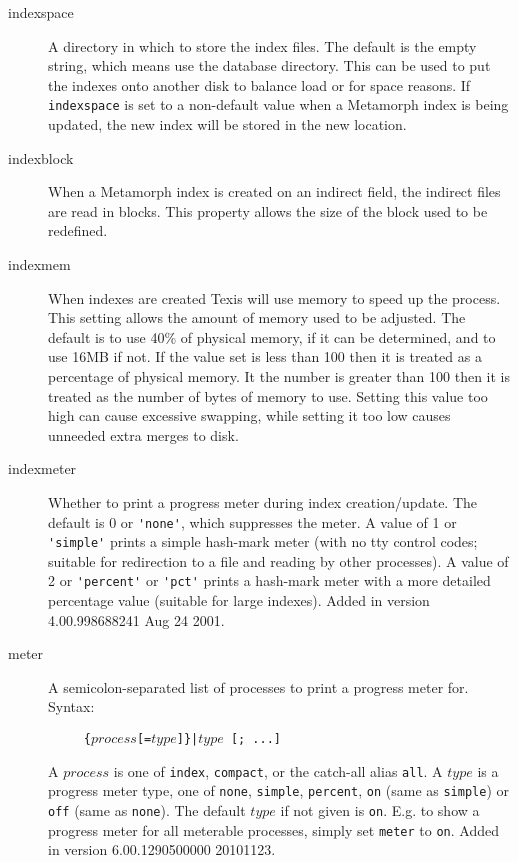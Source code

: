\begin{description}

\item[indexspace]
\label{indexspace}
A directory in which to store the index files.  The
default is the empty string, which means use the database directory.
This can be used to put the indexes onto another disk to balance load
or for space reasons.  If \verb`indexspace` is set to a non-default
value when a Metamorph index is being updated, the new index will be
stored in the new location.

\item[indexblock] When a Metamorph index is created on an indirect field,
the indirect files are read in blocks.  This property allows the size
of the block used to be redefined.

\item[indexmem]
\label{indexmem}
  When indexes are created Texis will use memory to speed up the
process.  This setting allows the amount of memory used to be
adjusted.  The default is to use 40\% of physical memory, if it
can be determined, and to use 16MB if not.  If the value set is less
than 100 then it is treated as a percentage of physical memory.  It
the number is greater than 100 then it is treated as the number of
bytes of memory to use.  Setting this value too high can cause
excessive swapping, while setting it too low causes unneeded extra
merges to disk.

\item[indexmeter]
\label{indexmeter}
  Whether to print a progress meter during index creation/update.
The default is 0 or \verb`'none'`, which suppresses the meter.
A value of 1 or \verb`'simple'` prints a simple hash-mark meter
(with no tty control codes; suitable for redirection to a file and
reading by other processes).  A value of 2 or \verb`'percent'` or
\verb`'pct'` prints a hash-mark meter with a more detailed percentage
value (suitable for large indexes).  Added in
version 4.00.998688241 Aug 24 2001.

\item[meter]

  A semicolon-separated list of processes to print a progress meter
for.  Syntax:

\verb`     `{\tt \{$process$[=$type$]\}|$type$ [; ...]}

A $process$ is one of \verb`index`, \verb`compact`, or the catch-all
alias \verb`all`.  A $type$ is a progress meter type, one of
\verb`none`, \verb`simple`, \verb`percent`, \verb`on` (same as
\verb`simple`) or \verb`off` (same as \verb`none`).  The default
$type$ if not given is \verb`on`.  E.g. to show a progress meter for
all meterable processes, simply set \verb`meter` to \verb`on`.
Added in version 6.00.1290500000 20101123.


\end{description}
